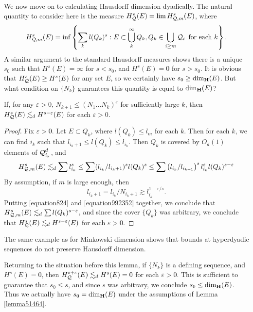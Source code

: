 We now move on to calculating Hausdorff dimension dyadically. The natural quantity to consider here is the measure $H^s_{\operatorname{\mathcal{Q}}}(E) = \lim H^s_{\operatorname{\mathcal{Q}},m}(E)$, where
%
\[ H^s_{\operatorname{\mathcal{Q}},m}(E) = \inf \left\{ \sum_k l(Q_k)^s : E \subset \bigcup_k^\infty Q_k, Q_k \in \bigcup_{i \geq m} \operatorname{\mathcal{Q}}_i\ \text{for each $k$} \right\}. \]
%
A similar argument to the standard Hausdorff measures shows there is a unique $s_0$ such that $H^s(E) = \infty$ for $s < s_0$, and $H^s(E) = 0$ for $s > s_0$. It is obvious that $H^s_{\operatorname{\mathcal{Q}}}(E) \geq H^s(E)$ for any set $E$, so we certainly have $s_0 \geq \operatorname{\dim_{\mathbf{H}}}(E)$. But what condition on $\{ N_k \}$ guarantees this quantity is equal to $\operatorname{\dim_{\mathbf{H}}}(E)$?

\begin{lemma} \label{lemma51464}
	If, for any $\varepsilon > 0$, $N_{k+1} \leq (N_1 \dots N_k)^\varepsilon$ for sufficiently large $k$, then $H^s_{\operatorname{\mathcal{Q}}}(E) \lesssim_d H^{s-\varepsilon}(E)$ for each $\varepsilon > 0$.
\end{lemma}
\begin{proof}
	Fix $\varepsilon > 0$. Let $E \subset Q_k$, where $l(Q_k) \leq l_m$ for each $k$. Then for each $k$, we can find $i_k$ such that $l_{i_k+1} \leq l(Q_k) \leq l_{i_k}$. Then $Q_k$ is covered by $O_d(1)$ elements of $\operatorname{\mathcal{Q}}_{i_k}^d$, and
	\begin{equation} \label{equation824} H^s_{\operatorname{\mathcal{Q}},m}(E) \lesssim_d \sum l_{i_k}^s \leq \sum (l_{i_k}/l_{i_k+1})^s l(Q_k)^s \leq \sum \left( l_{i_k}/l_{i_{k+1}} \right)^s l_{i_k}^\varepsilon l(Q_k)^{s - \varepsilon} \end{equation}
	By assumption, if $m$ is large enough, then
	\begin{equation} \label{equation992352}
		l_{i_k+1} = l_{i_k}/N_{i_k+1} \gtrsim l_{i_k}^{1 + \varepsilon/s}.
	\end{equation}
	Putting \eqref{equation824} and \eqref{equation992352} together, we conclude that $H^s_{\operatorname{\mathcal{Q}},m}(E) \lesssim_d \sum l(Q_k)^{s-\varepsilon}$, and since the cover $\{ Q_k \}$ was arbitrary, we conclude that $H^s_{\operatorname{\mathcal{Q}}}(E) \lesssim_d H^{s-\varepsilon}(E)$ for each $\varepsilon > 0$.
\end{proof}

\begin{remark}
	The same example as for Minkowski dimension shows that bounds at hyperdyadic sequences do not preserve Hausdorff dimension.
\end{remark}

Returning to the situation before this lemma, if $\{ N_k \}$ is a defining sequence, and $H^s(E) = 0$, then $H^{s+\varepsilon}_{\operatorname{\mathcal{Q}}}(E) \lesssim_d H^s(E) = 0$ for each $\varepsilon > 0$. This is sufficient to guarantee that $s_0 \leq s$, and since $s$ was arbitrary, we conclude $s_0 \leq \operatorname{\dim_{\mathbf{H}}}(E)$. Thus we actually have $s_0 = \operatorname{\dim_{\mathbf{H}}}(E)$ under the assumptions of Lemma \ref{lemma51464}.








